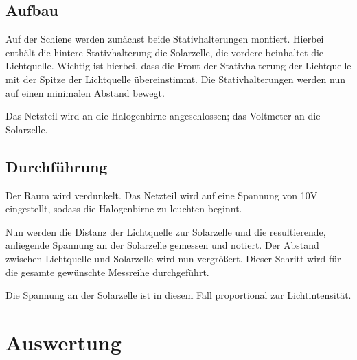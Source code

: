 \documentclass[12pt, a4paper]{article}
\begin{document}
\subsection{Aufbau}
Auf der Schiene werden zunächst beide Stativhalterungen montiert.
Hierbei enthält die hintere Stativhalterung die Solarzelle, die vordere beinhaltet die Lichtquelle.
Wichtig ist hierbei, dass die Front der Stativhalterung der Lichtquelle mit der Spitze der Lichtquelle übereinstimmt.
Die Stativhalterungen werden nun auf einen minimalen Abstand bewegt.

Das Netzteil wird an die Halogenbirne angeschlossen; das Voltmeter an die Solarzelle.

\subsection{Durchführung}
Der Raum wird verdunkelt.
Das Netzteil wird auf eine Spannung von 10V eingestellt, sodass die Halogenbirne zu leuchten beginnt.

Nun werden die Distanz der Lichtquelle zur Solarzelle und die resultierende, anliegende Spannung an der Solarzelle gemessen und notiert.
Der Abstand zwischen Lichtquelle und Solarzelle wird nun vergrößert. Dieser Schritt wird für die gesamte gewünschte Messreihe durchgeführt.

Die Spannung an der Solarzelle ist in diesem Fall proportional zur Lichtintensität.

\section{Auswertung}
\end{document}
